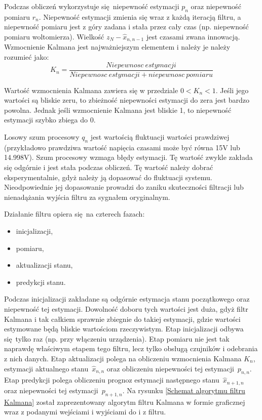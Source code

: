 {{{        Podczas obliczeń wykorzystuje się niepewność estymacji $p_n$ oraz niepewność pomiaru $r_n$. Niepewność estymacji zmienia się wraz z każdą iteracją filtru, a niepewność pomiaru jest z góry zadana i stała przez cały czas (np. niepewność pomiaru woltomierza). Wielkość $z_N - \hat{x}_{n,n-1}$ jest czasami zwana innowacją.
        Wzmocnienie Kalmana jest najważniejszym elementem i należy je należy rozumieć jako:
        \begin{equation}
            K_n=\frac{Niepewnosc\:estymacji}{Niepewnosc\:estymacji + niepewnosc\:pomiaru}
        \end{equation}

        Wartość wzmocnienia Kalmana zawiera się w przedziale $0<K_n<1$. Jeśli jego wartości są bliskie zeru, to zbieżność niepewności estymacji do zera jest bardzo powolna. Jednak jeśli wzmocnienie Kalmana jest bliskie 1, to niepewność estymacji szybko zbiega do 0.

        Losowy szum procesowy $q_n$ jest wartością fluktuacji wartości prawdziwej (przykładowo prawdziwa wartość napięcia  czasami może być równa 15V lub 14.998V). Szum procesowy wzmaga błędy estymacji. Tę wartość zwykle zakłada się odgórnie i jest stała podczas obliczeń. Tę wartość należy dobrać eksperymentalnie, gdyż należy ją dopasować do fluktuacji systemu. Nieodpowiednie jej dopasowanie prowadzi do zaniku skuteczności filtracji lub nienadążania wyjścia filtru za sygnałem oryginalnym.

        Działanie filtru opiera się na czterech fazach:
        
        \begin{itemize}
            \item inicjalizacji,
            \item pomiaru,
            \item aktualizacji stanu,
            \item predykcji stanu.
        \end{itemize}

        Podczas inicjalizacji zakładane są odgórnie estymacja stanu początkowego oraz niepewność tej estymacji. Dowolność doboru tych wartości jest duża, gdyż filtr Kalmana i tak całkiem sprawnie zbiegnie do takiej estymacji, gdzie wartości estymowane będą bliskie wartościom rzeczywistym. Etap inicjalizacji odbywa się tylko raz (np. przy włączeniu urządzenia).
        Etap pomiaru nie jest tak naprawdę właściwym etapem tego filtru, lecz tylko obsługą czujników i odebrania z nich danych.
        Etap aktualizacji polega na obliczeniu wzmocnienia Kalmana $K_n$, estymacji aktualnego stanu~$\hat{x}_{n,n}$ oraz obliczeniu niepewności tej estymacji~$p_{n,n}$.
        Etap predykcji polega obliczeniu prognoz estymacji następnego stanu~$\hat{x}_{n+1,n}$ oraz niepewności tej estymacji~$p_{n+1,n}$. 
        Na rysunku \ref{Schemat algorytmu filtru Kalmana} został zaprezentowany algorytm filtru Kalmana w formie graficznej wraz z podanymi wejściami i wyjściami do i z filtru.

}}}
